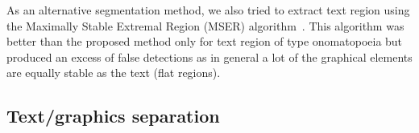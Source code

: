 
% 

As an alternative segmentation method, we also tried to extract text region using the Maximally Stable Extremal Region (MSER) algorithm~\cite{matas2004robust}.
This algorithm was better than the proposed method only for text region of type onomatopoeia but produced an excess of false detections as in general a lot of the graphical elements are equally stable as the text (flat regions).



\subsection{Text/graphics separation}
\label{sec:in:textgraphicseparation}

